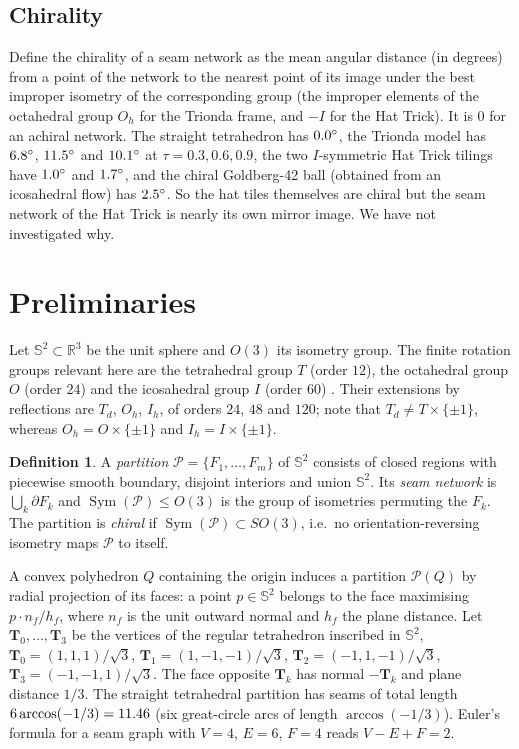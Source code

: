 \documentclass[11pt]{article}
\theoremstyle{definition}
\newtheorem{definition}[theorem]{Definition}
\theoremstyle{remark}
\newcommand{\Sph}{\mathbb{S}^2}
\newcommand{\R}{\mathbb{R}}
\DeclareMathOperator{\Sym}{Sym}
\begin{document}
\subsection{Chirality}
Define the chirality of a seam network as the mean angular distance (in degrees) from a point of the network to the nearest point of its image under the best improper isometry of the corresponding group (the improper elements of the octahedral group $O_h$ for the Trionda frame, and $-I$ for the Hat Trick).
It is $0$ for an achiral network. The straight tetrahedron has $0.0^\circ$, the Trionda model has $6.8^\circ$, $11.5^\circ$ and $10.1^\circ$ at $\tau=0.3,0.6,0.9$, the two $I$-symmetric Hat Trick tilings have $1.0^\circ$ and $1.7^\circ$, and the
chiral Goldberg-42 ball (obtained from an icosahedral flow) has $2.5^\circ$. So the hat tiles themselves are chiral but the seam network of the Hat Trick is nearly its own mirror image. We have not investigated why.

\section{Preliminaries}
Let $\Sph\subset\R^3$ be the unit sphere and $O(3)$ its isometry group. The finite rotation groups relevant here are
the tetrahedral group $T$ (order $12$), the octahedral group $O$ (order $24$) and the icosahedral group $I$
(order $60$) \citep{coxeter_regular}. Their extensions by reflections are $T_d$, $O_h$, $I_h$, of orders $24$, $48$ and $120$;
note that $T_d\ne T\times\{\pm1\}$, whereas $O_h=O\times\{\pm1\}$ and $I_h=I\times\{\pm1\}$.

\begin{definition}
A \emph{partition} $\mathcal P=\{F_1,\dots,F_m\}$ of $\Sph$ consists of closed regions with piecewise smooth boundary,
disjoint interiors and union $\Sph$. Its \emph{seam network} is $\bigcup_k\partial F_k$ and
$\Sym(\mathcal P)\le O(3)$ is the group of isometries permuting the $F_k$. The partition is \emph{chiral} if
$\Sym(\mathcal P)\subset SO(3)$, i.e.\ no orientation-reversing isometry maps $\mathcal P$ to itself.
\end{definition}

A convex polyhedron $Q$ containing the origin induces a partition $\mathcal P(Q)$ by radial projection of its faces: a point
$p\in\Sph$ belongs to the face maximising $p\cdot n_f/h_f$, where $n_f$ is the unit outward normal and $h_f$ the
plane distance. Let $\mathbf T_0,\dots,\mathbf T_3$ be the vertices of the regular tetrahedron inscribed in $\Sph$,
$\mathbf T_0=(1,1,1)/\sqrt3$, $\mathbf T_1=(1,-1,-1)/\sqrt3$, $\mathbf T_2=(-1,1,-1)/\sqrt3$, $\mathbf T_3=(-1,-1,1)/\sqrt3$.
The face opposite $\mathbf T_k$ has normal $-\mathbf T_k$ and plane distance $1/3$. The straight tetrahedral
partition has seams of total length $6\arccos(-1/3)=11.46$ (six great-circle arcs of length $\arccos(-1/3)$).
Euler's formula for a seam graph with $V=4$, $E=6$, $F=4$ reads $V-E+F=2$.
\end{document}
